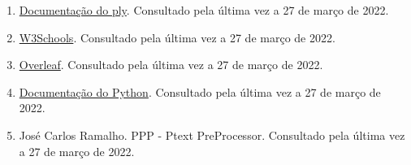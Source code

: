 \documentclass{article}
\begin{document}
\begin{enumerate}
\item \href{https://www.dabeaz.com/ply/ply.html}{Documentação do ply}. Consultado pela última vez a 27 de março de 2022.
\item \href{https://www.w3schools.com/TAgs/default.asp}{W3Schools}. Consultado pela última vez a 27 de março de 2022.
\item \href{https://www.overleaf.com/learn}{Overleaf}. Consultado pela última vez a 27 de março de 2022.
\item \href{https://docs.python.org/3/}{Documentação do Python}. Consultado pela última vez a 27 de março de 2022.
\item José Carlos Ramalho. PPP - Ptext PreProcessor. Consultado pela última vez a 27 de março de 2022.
\end{enumerate}
\end{document}
